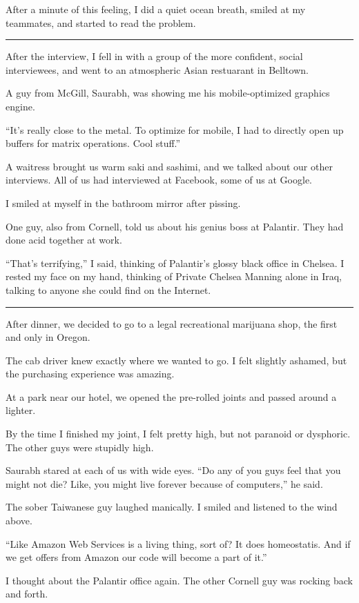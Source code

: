 After a minute of this feeling, I did a quiet ocean breath, smiled at my
teammates, and started to read the problem.

\plainfancybreak{12pt}{2}{* * *}

After the interview, I fell in with a group of the more confident, social
interviewees, and went to an atmospheric Asian restuarant in Belltown.

A guy from McGill, Saurabh, was showing me his mobile-optimized graphics engine.

``It's really close to the metal.  To optimize for mobile, I had to directly
open up buffers for matrix operations.  Cool stuff.''

A waitress brought us warm saki and sashimi, and we talked about our other
interviews.  All of us had interviewed at Facebook, some of us at Google.  

I smiled at myself in the bathroom mirror after pissing.

One guy, also from Cornell, told us about his genius boss at Palantir.  They had
done acid together at work.

``That's terrifying,'' I said, thinking of Palantir's glossy black office in
Chelsea.  I rested my face on my hand, thinking of Private Chelsea Manning alone
in Iraq, talking to anyone she could find on the Internet.

\plainfancybreak{12pt}{2}{* * *}

After dinner, we decided to go to a legal recreational marijuana shop, the first
and only in Oregon. 

The cab driver knew exactly where we wanted to go.  I felt slightly ashamed, but
the purchasing experience was amazing. 

At a park near our hotel, we opened the pre-rolled joints and passed around a
lighter.  

By the time I finished my joint, I felt pretty high, but not paranoid or
dysphoric.  The other guys were stupidly high.

Saurabh stared at each of us with wide eyes.  ``Do any of you guys feel that you
might not die?  Like, you might live forever because of computers,'' he said.

The sober Taiwanese guy laughed manically.  I smiled and listened to the wind
above.

``Like Amazon Web Services is a living thing, sort of?  It does homeostatis.
And if we get offers from Amazon our code will become a part of it.''

I thought about the Palantir office again.  The other Cornell guy was rocking
back and forth.

